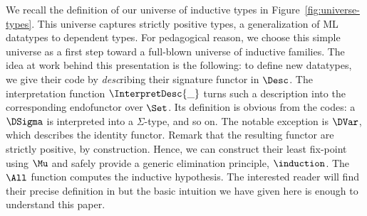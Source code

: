 \documentclass{scrartcl}
\theoremstyle{plain}
\theoremstyle{definition}
\begin{document}
We recall the definition of our universe of inductive types in
Figure~\ref{fig:universe-types}. This universe captures
strictly positive types, a generalization of ML datatypes to dependent
types. For pedagogical reason, we choose this simple universe as a
first step toward a full-blown universe of inductive families.
The idea at work behind this presentation is the following: to define
new datatypes, we give their code by \emph{desc}ribing their signature
functor in \(\Desc\). The interpretation function
\(\InterpretDesc{\_}\) turns such a description into the corresponding
endofunctor over \(\Set\). Its definition is obvious from the codes: a
\(\DSigma\) is interpreted into a \(\Sigma\)-type, and so on. The
notable exception is \(\DVar\), which describes the identity
functor. Remark that the resulting functor are strictly positive, by
construction. Hence, we can construct their least fix-point using
\(\Mu\) and safely provide a generic elimination principle,
\(\induction\). The \(\All\) function computes the inductive
hypothesis. The interested reader will find their precise definition
in \citet{dagand:levitation} but the basic intuition we have given
here is enough to understand this paper.
\end{document}

